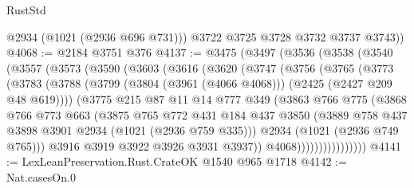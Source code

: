 \begin{lexlean}{RustStd}
\begin{coremodule}
          @2934
          (@1021 (@2936 @696 @731)))
        @3722
        @3725
        @3728
        @3732
        @3737
        @3743))
@4068 := @2184 @3751 @376
@4137 := @3475
    (@3497
      (@3536
        (@3538
          (@3540
            (@3557
              (@3573
                (@3590
                  (@3603
                    (@3616
                      (@3620
                        (@3747
                          (@3756
                            (@3765
                              (@3773
                                (@3783
                                  (@3788
                                    (@3799
                                      (@3804 (@3961 (@4066 @4068)))
                                      (@2425 (@2427 @209 @48 @619))))
                                  (@3775
                                    @215
                                    @87
                                    @11
                                    @14
                                    @777
                                    @349
                                    (@3863
                                      @766
                                      @775
                                      (@3868
                                        @766
                                        @773
                                        @663
                                        (@3875
                                          @765
                                          @772
                                          @431
                                          @184
                                          @437
                                          @3850
                                          (@3889
                                            @758
                                            @437
                                            @3898
                                            @3901
                                            @2934
                                            (@1021 (@2936 @759 @335)))
                                          @2934
                                          (@1021 (@2936 @749 @765)))
                                        @3916
                                        @3919
                                        @3922
                                        @3926
                                        @3931
                                        @3937))
                                    @4068))))))))))))))))
@4141 := LexLeanPreservation.Rust.CrateOK @1540 @965 @1718
@4142 := Nat.casesOn.{0}

\end{coremodule}
\end{lexlean}
